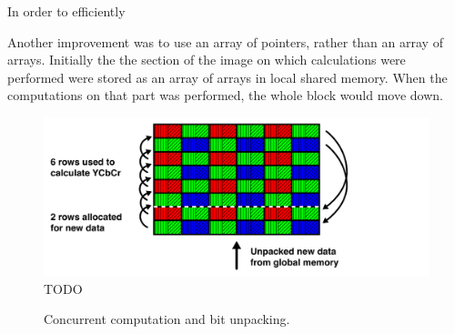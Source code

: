 In order to efficiently

Another improvement was to use an array of pointers, rather than an array of arrays.
Initially the the section of the image on which calculations were performed were stored as an array of arrays in local shared memory.
When the computations on that part was performed, the whole block would move down.
\begin{figure}[H]
    \centering
    \includegraphics[width=\textwidth]{figures/polarized_image/rolling.pdf}
    \caption{TODO}
\end{figure}

\begin{figure}[H]
    \centering
    \caption{Concurrent computation and bit unpacking.}
    \label{fig:saperation}
\end{figure}